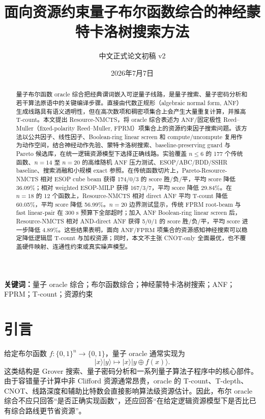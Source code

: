 \documentclass[UTF8,fontset=macnew,11pt]{ctexart}
\title{面向资源约束量子布尔函数综合的神经蒙特卡洛树搜索方法}
\author{中文正式论文初稿 v2}
\date{2026年7月7日}
\newcommand{\method}{Resource-NMCTS}
\newcommand{\pareto}{Pareto-Resource-NMCTS}
\newcommand{\anf}{\ensuremath{\mathrm{ANF}}}
\newcommand{\fprm}{\ensuremath{\mathrm{FPRM}}}
\begin{document}
\maketitle

\begin{abstract}
量子布尔函数 oracle 综合把经典谓词嵌入可逆量子线路，是量子搜索、量子密码分析和若干算法原语中的关键编译步骤。直接由代数正规形（algebraic normal form, ANF）生成线路具有语义透明性，但在高次数项和稠密项集合上会产生大量重复计算，并推高 T-count。本文提出 \method{}，将 oracle 综合表述为 \anf{}/固定极性 Reed--Muller（fixed-polarity Reed--Muller, FPRM）项集合上的资源约束因子搜索问题。该方法以公共因子、线性因子、Boolean-ring linear screen 和 compute/uncompute 复用作为动作空间，结合神经动作先验、蒙特卡洛树搜索、baseline-preserving guard 与 Pareto 候选库，在统一逻辑资源模型下选择正确线路。实验覆盖 $n\leq6$ 的 177 个传统函数、$n=14$ 至 $n=20$ 的高维随机 \anf{} 压力测试、ESOP/ABC/BDD/SSHR baseline、搜索消融和小规模 exact 参照。在传统函数切片上，\pareto{} 相对 ESOP cube beam 获得 174/0/3 的 score 胜/负/平，平均 score 降低 36.09\%；相对 weighted ESOP-MILP 获得 167/3/7，平均 score 降低 29.84\%。在 $n=18$ 的 12 个函数上，\method{} 相对 direct ANF 平均 T-count 降低 60.05\%，平均 score 降低 56.99\%。$n=20$ 边界测试显示，传统 FPRM root-beam 与 fast linear-pair 在 300 s 预算下全部超时；加入 ANF Boolean-ring linear screen 后，\method{} 相对 AND-direct ANF 获得 5/0/1 的 score 胜/负/平，平均 score 进一步降低 4.89\%。这些结果表明，面向 \anf{}/\fprm{} 项集合的资源感知神经搜索可以稳定降低逻辑层 T-count 与加权资源；同时，本文不主张 CNOT-only 全面最优，也不覆盖硬件映射、连通性约束或真实噪声模型。
\end{abstract}

\noindent\textbf{关键词：}量子 oracle 综合；布尔函数综合；神经蒙特卡洛树搜索；ANF；FPRM；T-count；资源约束

\section{引言}

给定布尔函数 $f:\{0,1\}^{n}\rightarrow\{0,1\}$，量子 oracle 通常实现为
\begin{equation}
  |x\rangle|y\rangle \mapsto |x\rangle|y\oplus f(x)\rangle .
  \label{eq:oracle}
\end{equation}
这类结构是 Grover 搜索、量子密码分析和一系列量子算法子程序中的核心部件。由于容错量子计算中非 Clifford 资源通常昂贵，oracle 的 T-count、T-depth、CNOT、线路深度和辅助比特数会直接影响算法级资源估计。因此，布尔 oracle 综合不应只回答“是否正确实现函数”，还应回答“在给定逻辑资源模型下是否比已有综合路线更节省资源”。
\end{document}
